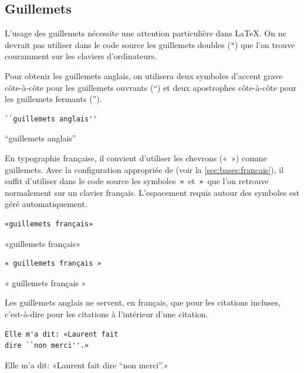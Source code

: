 \subsection{Guillemets}
\label{sec:bases:caracteres:guillemets}

L'usage des guillemets nécessite une attention particulière dans
{\LaTeX}. On ne devrait pas utiliser dans le code source les
guillemets doubles (\verb="=) que l'on trouve couramment sur les
claviers d'ordinateurs.

Pour obtenir les guillemets anglais, on utilisera deux symboles
d'accent grave côte-à-côte pour les guillemets ouvrants (``) et deux
apostrophes côte-à-côte pour les guillemets fermants ('').
\begin{demo}
  \begin{texample}
\begin{lstlisting}[escapeinside={}]
``guillemets anglais''
\end{lstlisting}
    \producing
    ``guillemets anglais''
  \end{texample}
\end{demo}

En typographie française, il convient d'utiliser les chevrons («\ »)
comme guillemets. Avec la configuration appropriée de 
(voir la \autoref{sec:bases:francais}), il suffit d'utiliser dans le
code source les symboles \,\verb=«=\, et \,\verb=»=\, que l'on
retrouve normalement sur un clavier français. L'espacement requis
autour des symboles est géré automatiquement.
\begin{demo}
  \begin{texample}
\begin{lstlisting}
«guillemets français»
\end{lstlisting}
    \producing
    «guillemets français»
  \end{texample}
  \begin{texample}
\begin{lstlisting}
« guillemets français »
\end{lstlisting}
    \producing
    « guillemets français »
  \end{texample}
\end{demo}
Les guillemets anglais ne servent, en français, que pour les citations
incluses, c'est-à-dire pour les citations à l'intérieur d'une
citation.
\begin{demo}
  \begin{texample}
\begin{lstlisting}[escapeinside={}]
Elle m'a dit: «Laurent fait
dire ``non merci''.»
\end{lstlisting}
    \producing
    Elle m'a dit: «Laurent fait
    dire ``non merci''.»
  \end{texample}
\end{demo}

